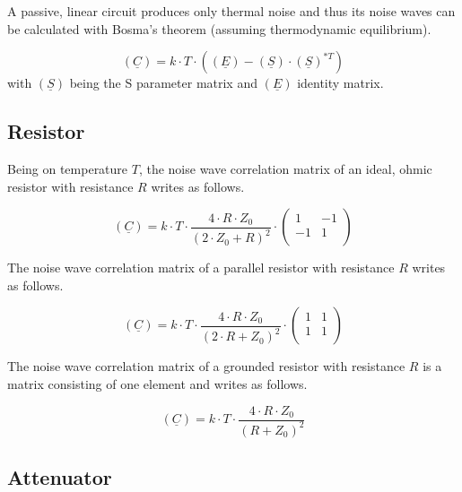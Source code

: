 \documentclass[10pt]{report}
\begin{document}
A passive, linear circuit produces only thermal noise and thus its
noise waves can be calculated with Bosma's theorem (assuming
thermodynamic equilibrium).

\begin{equation}
(\underline{C}) = k\cdot T\cdot \left( (\underline{E}) - (\underline{S})\cdot(\underline{S})^{*T} \right)
\end{equation}
with $(\underline{S})$ being the S parameter matrix and $(\underline{E})$ identity matrix.


\subsection{Resistor}

Being on temperature $T$, the noise wave correlation matrix of an
ideal, ohmic resistor with resistance $R$ writes as follows.

\begin{equation}
(\underline{C}) = k\cdot T\cdot\frac{4\cdot R\cdot Z_0}{(2\cdot Z_0+R)^2}\cdot
\begin{pmatrix}
   1 & -1\\
  -1 &  1\\
\end{pmatrix}
\end{equation}

The noise wave correlation matrix of a parallel resistor with resistance $R$
writes as follows.

\begin{equation}
(\underline{C}) = k\cdot T\cdot\frac{4\cdot R\cdot Z_0}{(2\cdot R+Z_0)^2}\cdot
\begin{pmatrix}
  1 & 1\\
  1 & 1\\
\end{pmatrix}
\end{equation}

The noise wave correlation matrix of a grounded resistor with resistance $R$
is a matrix consisting of one element and writes as follows.

\begin{equation}
(\underline{C}) = k\cdot T\cdot\frac{4\cdot R\cdot Z_0}{(R+Z_0)^2}
\end{equation}


\subsection{Attenuator}
\end{document}
